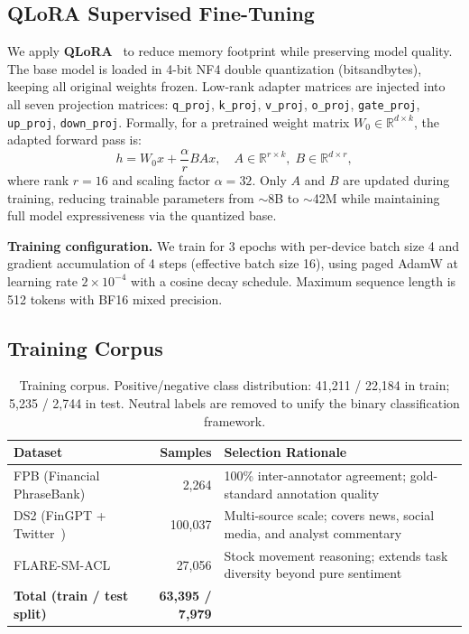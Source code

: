 \documentclass[11pt,letterpaper]{article}
\begin{document}
\subsection{QLoRA Supervised Fine-Tuning}
\label{subsec:qlora}

We apply \textbf{QLoRA}~\cite{dettmers2024qlora} to reduce memory
footprint while preserving model quality.
The base model is loaded in 4-bit NF4 double quantization
(bitsandbytes), keeping all original weights frozen.
Low-rank adapter matrices are injected into all seven projection
matrices: \texttt{q\_proj}, \texttt{k\_proj}, \texttt{v\_proj},
\texttt{o\_proj}, \texttt{gate\_proj}, \texttt{up\_proj},
\texttt{down\_proj}.
Formally, for a pretrained weight matrix $W_0 \in \mathbb{R}^{d\times k}$,
the adapted forward pass is:
\[
  h = W_0 x + \frac{\alpha}{r} B A x,
  \quad A \in \mathbb{R}^{r \times k},\; B \in \mathbb{R}^{d \times r},
\]
where rank $r=16$ and scaling factor $\alpha=32$.
Only $A$ and $B$ are updated during training, reducing trainable
parameters from $\sim$8B to $\sim$42M while maintaining full model
expressiveness via the quantized base.

\textbf{Training configuration.}
We train for 3 epochs with per-device batch size 4 and gradient
accumulation of 4 steps (effective batch size 16), using
paged AdamW at learning rate $2\times10^{-4}$ with a cosine decay
schedule.
Maximum sequence length is 512 tokens with BF16 mixed precision.

\subsection{Training Corpus}

\begin{table}[ht]
\centering
\small
\begin{tabular}{@{}lrp{6.2cm}@{}}
\toprule
\textbf{Dataset} & \textbf{Samples} & \textbf{Selection Rationale} \\
\midrule
FPB (Financial PhraseBank) & 2,264 & 100\% inter-annotator agreement;
  gold-standard annotation quality \\
DS2 (FinGPT + Twitter~\cite{wang2023fingpt}) & 100,037 & Multi-source scale;
  covers news, social media, and analyst commentary \\
FLARE-SM-ACL & 27,056 & Stock movement reasoning;
  extends task diversity beyond pure sentiment \\
\midrule
\textbf{Total (train / test split)} & \textbf{63,395 / 7,979} & \\
\bottomrule
\end{tabular}
\caption{Training corpus. Positive/negative class distribution:
  41,211 / 22,184 in train; 5,235 / 2,744 in test.
  Neutral labels are removed to unify the binary classification framework.}
\label{tab:data}
\end{table}
\end{document}

